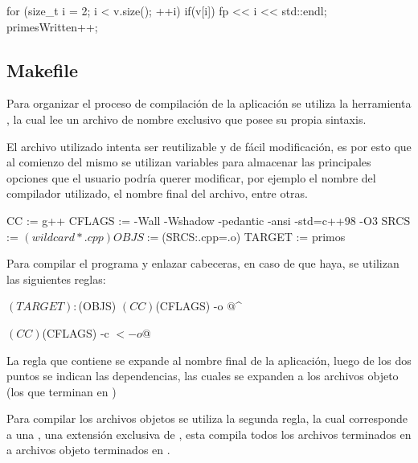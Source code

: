 \documentclass[12pt]{article}
\newenvironment{fullgrayverb}
{\verbbox}
{\endverbbox\par\colorbox{gray!25}{\parbox{\textwidth}{\theverbbox}}\par}
\begin{document}
\begin{fullgrayverb}[\mbox{}]
for (size_t i = 2; i < v.size(); ++i) {
    if(v[i]) {
        fp << i << std::endl;
        primesWritten++;
    }
}
\end{fullgrayverb}

\subsection{Makefile}


Para organizar el proceso de compilación de la aplicación se utiliza la
herramienta , la cual lee un archivo de nombre exclusivo
 que posee su propia sintaxis.

El archivo  utilizado intenta ser reutilizable y de fácil
modificación, es por esto que al comienzo del mismo se utilizan variables para
almacenar las principales opciones que el usuario podría querer modificar, por
ejemplo el nombre del compilador utilizado, el nombre final del archivo, entre
otras.

\begin{fullgrayverb}[\mbox{}]
CC := g++
CFLAGS := -Wall -Wshadow -pedantic -ansi -std=c++98 -O3
SRCS := $(wildcard *.cpp)
OBJS := $(SRCS:.cpp=.o)
TARGET := primos
\end{fullgrayverb}

Para compilar el programa y enlazar cabeceras, en caso de que haya, se utilizan
las siguientes reglas:

\begin{fullgrayverb}[\mbox{}]
$(TARGET): $(OBJS)
    $(CC) $(CFLAGS) -o $@ $^

    $(CC) $(CFLAGS) -c $< -o $@
\end{fullgrayverb}

La regla que contiene  se expande al nombre final de la
aplicación, luego de los dos puntos se indican las dependencias, las cuales se
expanden a los archivos objeto (los que terminan en )

Para compilar los archivos objetos se utiliza la segunda regla, la cual
corresponde a una , una extensión exclusiva de , 
esta  compila todos los archivos terminados en  a
archivos objeto terminados en .
\end{document}
